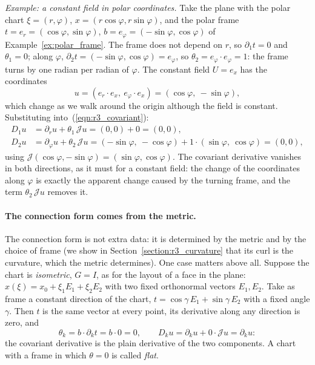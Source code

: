 \emph{Example: a constant field in polar coordinates.} Take the plane with the polar chart $\xi = (r, \varphi)$, $x = (r\cos\varphi, r\sin\varphi)$, and the polar frame $t = e_r = (\cos\varphi, \sin\varphi)$, $b = e_\varphi = (-\sin\varphi, \cos\varphi)$ of Example~\ref{ex:polar_frame}. The frame does not depend on $r$, so $\partial_1t = 0$ and $\theta_1 = 0$; along $\varphi$, $\partial_2t = (-\sin\varphi, \cos\varphi) = e_\varphi$, so $\theta_2 = e_\varphi\cdot e_\varphi = 1$: the frame turns by one radian per radian of $\varphi$. The constant field $U = e_x$ has the coordinates
\begin{equation*}
u = (e_r\cdot e_x,\ e_\varphi\cdot e_x) = (\cos\varphi,\ -\sin\varphi) ,
\end{equation*}
which change as we walk around the origin although the field is constant. Substituting into~(\ref{eqn:r3_covariant}):
\begin{align*}
D_1u &= \partial_r u + \theta_1\,\mathcal Ju = (0, 0) + 0 = (0, 0) , \\
D_2u &= \partial_\varphi u + \theta_2\,\mathcal Ju = (-\sin\varphi,\ -\cos\varphi) + 1\cdot(\sin\varphi,\ \cos\varphi) = (0, 0) ,
\end{align*}
using $\mathcal J(\cos\varphi, -\sin\varphi) = (\sin\varphi, \cos\varphi)$. The covariant derivative vanishes in both directions, as it must for a constant field: the change of the coordinates along $\varphi$ is exactly the apparent change caused by the turning frame, and the term $\theta_2\,\mathcal Ju$ removes it.

\paragraph{The connection form comes from the metric.} The connection form is not extra data: it is determined by the metric and by the choice of frame (we show in Section~\ref{section:r3_curvature} that its curl is the curvature, which the metric determines). One case matters above all. Suppose the chart is \emph{isometric}, $G = I$, as for the layout of a face in the plane: $x(\xi) = x_0 + \xi_1 E_1 + \xi_2 E_2$ with two fixed orthonormal vectors $E_1, E_2$. Take as frame a constant direction of the chart, $t = \cos\gamma\, E_1 + \sin\gamma\, E_2$ with a fixed angle $\gamma$. Then $t$ is the same vector at every point, its derivative along any direction is zero, and
\begin{equation*}
\theta_k = b\cdot\partial_k t = b\cdot 0 = 0, \qquad D_ku = \partial_ku + 0\cdot\mathcal J u = \partial_ku :
\end{equation*}
the covariant derivative is the plain derivative of the two components. A chart with a frame in which $\theta = 0$ is called \emph{flat}.

